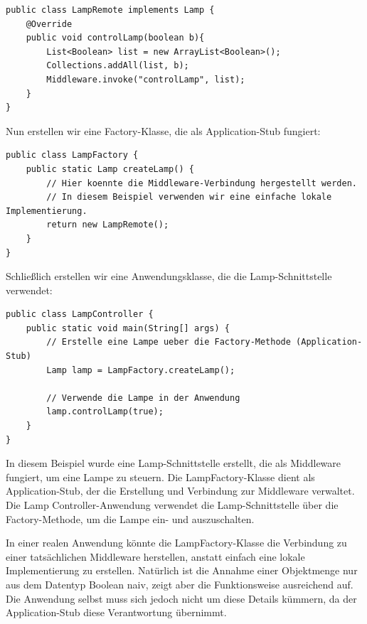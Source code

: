 \noindent\begin{minipage}{\textwidth}
\begin{lstlisting}[caption={RPC Remote Implementation},captionpos=b,label={lst:rpc-remote}]
public class LampRemote implements Lamp {
    @Override
    public void controlLamp(boolean b){
    	List<Boolean> list = new ArrayList<Boolean>(); 
        Collections.addAll(list, b);
        Middleware.invoke("controlLamp", list);
    }
}
\end{lstlisting}
\end{minipage}
Nun erstellen wir eine Factory-Klasse, die als Application-Stub fungiert:\\
\noindent\begin{minipage}{\textwidth}
\begin{lstlisting}[caption={Application Stub mit Factory Pattern},captionpos=b,label={lst:rpc-factory}]
public class LampFactory {
    public static Lamp createLamp() {
        // Hier koennte die Middleware-Verbindung hergestellt werden.
        // In diesem Beispiel verwenden wir eine einfache lokale Implementierung.
        return new LampRemote();
    }
}
\end{lstlisting}
\end{minipage}
Schließlich erstellen wir eine Anwendungsklasse, die die Lamp-Schnittstelle verwendet:\\
\noindent\begin{minipage}{\textwidth}
\begin{lstlisting}[caption={Controller ruft Middleware},captionpos=b,label={lst:rpc-controller}]
public class LampController {
	public static void main(String[] args) {
        // Erstelle eine Lampe ueber die Factory-Methode (Application-Stub)
        Lamp lamp = LampFactory.createLamp();

        // Verwende die Lampe in der Anwendung
        lamp.controlLamp(true);
    }
}
\end{lstlisting}
\end{minipage}
In diesem Beispiel wurde eine Lamp-Schnittstelle erstellt, die als Middleware fungiert, um eine Lampe zu steuern. Die LampFactory-Klasse dient als Application-Stub, der die Erstellung und Verbindung zur Middleware verwaltet. Die Lamp Controller-Anwendung verwendet die Lamp-Schnittstelle über die Factory-Methode, um die Lampe ein- und auszuschalten.

In einer realen Anwendung könnte die LampFactory-Klasse die Verbindung zu einer tatsächlichen Middleware herstellen, anstatt einfach eine lokale Implementierung zu erstellen. Natürlich ist die Annahme einer Objektmenge nur aus dem Datentyp Boolean naiv, zeigt aber die Funktionsweise ausreichend auf. Die Anwendung selbst muss sich jedoch nicht um diese Details kümmern, da der Application-Stub diese Verantwortung übernimmt.

